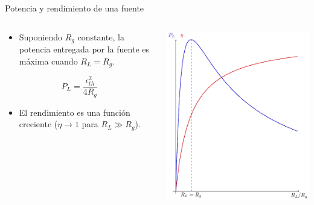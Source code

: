 \documentclass[aspectratio=169, usenames,svgnames,dvipsnames]{beamer}
\begin{document}
\begin{frame}[label={sec:org92b5379}]{Potencia y rendimiento de una fuente}
\begin{columns}
\begin{column}{0.5\columnwidth}
\begin{itemize}
\item Suponiendo \(R_g\) constante, la potencia entregada por la fuente es máxima cuando \(R_L = R_g\).
\end{itemize}

\begin{equation*}
  P_L = \frac{\epsilon^2_{th}}{4 R_g}
\end{equation*}

\begin{itemize}
\item El rendimiento es una función creciente (\(\eta \to 1\) para \(R_L \gg R_g\)).
\end{itemize}
\end{column}

\begin{column}{0.5\columnwidth}
\begin{center}
\includegraphics[height=0.85\textheight]{../figs/FuenteReal_PotenciaRendimiento.pdf}
\end{center}
\end{column}
\end{columns}
\end{frame}
\end{document}
